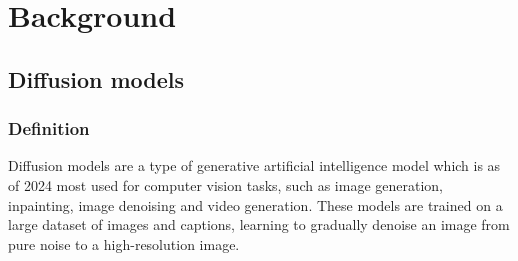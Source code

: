 \chapter{Background}
\section{Diffusion models}
\subsection{Definition}
Diffusion models are a type of generative artificial intelligence model which is as of 2024 most used for computer vision tasks, such as image generation, inpainting, image denoising and video generation. These models are trained on a large dataset of images and captions, learning to gradually denoise an image from pure noise to a high-resolution image.

